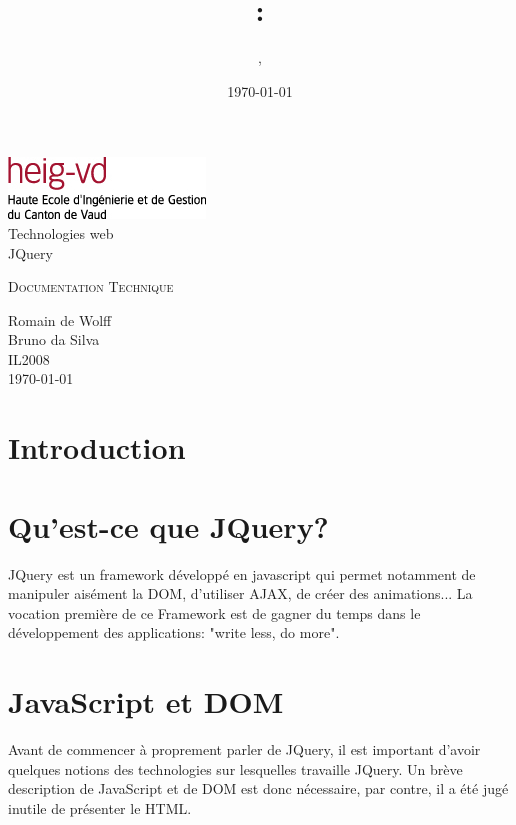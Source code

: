 \documentclass[10pt,a4paper,titlepage]{article}
\author{\auteurOne, \auteurTwo}
\title{\branchetag : \laboname}
\date{\today}
\newcommand{\branche}{Technologies web}
\newcommand{\laboname}{JQuery}
\newcommand{\auteurOne}{Romain de Wolff}
\newcommand{\auteurTwo}{Bruno da Silva}
\newcommand{\promo}{IL2008}
\begin{document}
\pagestyle{headings}
\begin{titlepage}
	\begin{center}
	\includegraphics{img/logo-HEIG-VD.jpg}\\
		\vspace{3cm}
		\LARGE \branche %
		\vspace{3cm}\\
		\Huge \laboname \\
		\vspace{3cm}

		\Large \textsc{Documentation Technique} \\
		\vspace{3cm}

		\large \auteurOne \\
		\auteurTwo \\	
		\vspace{10pt}
		\normalsize \textsc{\promo} \\

		\vspace{2cm}
		\today
	\end{center}
\end{titlepage}

\tableofcontents
\newpage
\pagestyle{fancy}
\section{Introduction}


\newpage
\section{Qu'est-ce que JQuery?}
JQuery est un framework développé en javascript qui permet notamment de manipuler aisément la DOM, d'utiliser AJAX, de créer des animations...
La vocation première de ce Framework est de gagner du temps dans le développement des applications: "write less, do more".

\newpage
\section{JavaScript et DOM}
Avant de commencer à proprement parler de JQuery, il est important d'avoir quelques notions des technologies sur lesquelles travaille JQuery. Un brève description de JavaScript et de DOM est donc nécessaire, par contre, il a été jugé inutile de présenter le HTML.
\end{document}
